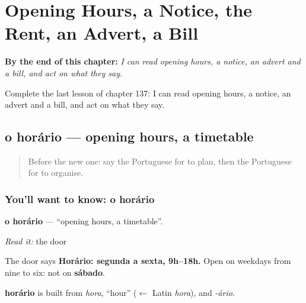 
\chapter{Opening Hours, a Notice, the Rent, an Advert, a Bill}
\label{ch:pt-opening-hours-a-notice-the-rent-an-advert-a-bill}

\begin{chapteropening}
\textbf{By the end of this chapter:} \emph{I can read opening hours, a notice, an advert and a bill, and act on what they say.}

Complete the last lesson of chapter 137: I can read opening hours, a notice, an advert and a bill, and act on what they say.
\end{chapteropening}

\section[o horário]{o horário — opening hours, a timetable}

\label{lesson:PT-C137-o-horario}



\begin{quote}
Before the new one: say the Portuguese for to plan, then the Portuguese for to organise.
\end{quote}

\subsection*{You'll want to know: o horário}
\textbf{o horário} — \textquotedblleft{}opening hours, a timetable\textquotedblright{}.

\emph{Read it:} the door

The door says \textbf{Horário: segunda a sexta, 9h–18h.} Open on weekdays from nine to six: not on \textbf{sábado}.

\begin{cousinweb}
\textbf{horário} is built from \emph{hora}, \textquotedblleft{}hour\textquotedblright{} ($\leftarrow$ Latin \emph{hora}), and \emph{-ário}.
\end{cousinweb}

